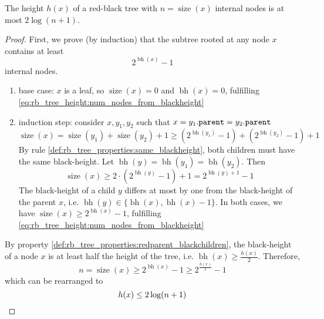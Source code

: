\begin{lemma}
  \label{lem:rb_tree_height}
  The height \(h(x)\) of a red-black tree with \(n = \operatorname{size}(x)\) internal nodes is at most \(2\log(n+1)\).
\end{lemma}
\begin{proof}
  First, we prove (by induction) that the subtree rooted at any node \(x\) contains at least 
  \begin{equation}
    \label{eq:rb_tree_height:num_nodes_from_blackheight}
    2^{\operatorname{bh}(x)} - 1
  \end{equation}
  internal nodes.
  \begin{enumerate}[partopsep=0em, topsep=0em, label=(\roman*)]
    \item base case: \(x\) is a leaf, so \(\operatorname{size}(x)=0\) and \(\operatorname{bh}(x)=0\), fulfilling \eqref{eq:rb_tree_height:num_nodes_from_blackheight} \textcolor{Green}{}
    \item induction step: consider \(x, y_1, y_2\) such that \(x = y_1\mathtt{.}\mathtt{parent} = y_2\mathtt{.}\mathtt{parent}\)
    \[
      \operatorname{size}(x) = \operatorname{size}(y_1) + \operatorname{size}(y_2) + 1 \geq (2^{\operatorname{bh}(y_1)} - 1) + (2^{\operatorname{bh}(y_2)} - 1) + 1
    \]
    By rule \ref{def:rb_tree_properties:same_blackheight}, both children must have the same black-height.
    Let \(\operatorname{bh}(y) = \operatorname{bh}(y_1) = \operatorname{bh}(y_2)\). Then 
    \[
      \operatorname{size}(x) \geq 2 \cdot (2^{\operatorname{bh}(y)} - 1) + 1 = 2^{\operatorname{bh}(y) + 1} - 1
    \]
    The black-height of a child \(y\) differs at most by one from the black-height of the parent \(x\), i.e. \(\operatorname{bh}(y)  \in \{\operatorname{bh}(x), \operatorname{bh}(x) - 1\}\).
    In both cases, we have \(\operatorname{size}(x) \geq 2^{\operatorname{bh}(x)} - 1\), fulfilling \eqref{eq:rb_tree_height:num_nodes_from_blackheight} \textcolor{Green}{}
\end{enumerate}
By property \ref{def:rb_tree_properties:redparent_blackchildren}, the black-height of a node \(x\) is at least half the height of the tree, i.e. \(\operatorname{bh}(x) \geq \frac{h(x)}{2}\).
Therefore,
\[
 n = \operatorname{size}(x) \geq 2^{\operatorname{bh}(x)} - 1 \geq 2^{\frac{h(x)}{2}} - 1
\]
which can be rearranged to
\[
  h(x) \leq 2\log(n+1) \qedhere
\]
\end{proof}

